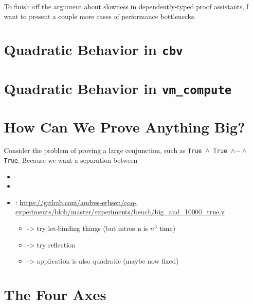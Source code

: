 
To finish off the argument about slowness in dependently-typed proof assistants, I want to present a couple more cases of performance bottlenecks.

\section{Quadratic Behavior in \texorpdfstring{\texttt{cbv}}{cbv}}

\section{Quadratic Behavior in \texorpdfstring{\texttt{vm\_compute}}{vm\_compute}}

\section{How Can We Prove Anything Big?}
Consider the problem of proving a large conjunction, such as \texttt{True $\wedge$ True $\wedge \cdots\wedge$ True}.
Because we want a separation between 
\begin{itemize}
  \item {}
  \item {}
  \item {}: \url{https://github.com/andres-erbsen/coq-experiments/blob/master/experiments/bench/big\_and\_10000\_true.v}
  \begin{itemize}
      \item -> try let-binding things (but intros n is $n^3$ time)
      \item -> try reflection
      \item -> application is also quadratic (maybe now fixed)
      \end{itemize}
  
\end{itemize}


\section{The Four Axes}

